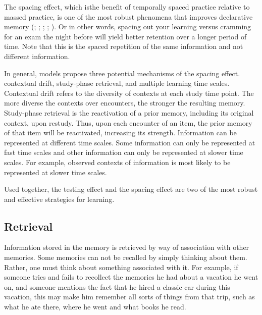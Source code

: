\documentclass[
]{krantz}
\begin{document}
The spacing effect, which isthe benefit of temporally spaced practice relative to massed practice, is one of the most robust phenomena that improves declarative memory (; ; ; ; ). Or in other words, spacing out your learning versus cramming for an exam the night before will yield better retention over a longer period of time. Note that this is the spaced repetition of the same information and not different information.

In general, models propose three potential mechanisms of the spacing effect. contextual drift, study-phase retrieval, and multiple learning time scales. Contextual drift refers to the diversity of contexts at each study time point. The more diverse the contexts over encounters, the stronger the resulting memory. Study-phase retrieval is the reactivation of a prior memory, including its original context, upon restudy. Thus, upon each encounter of an item, the prior memory of that item will be reactivated, increasing its strength. Information can be represented at different time scales. Some information can only be represented at fast time scales and other information can only be represented at slower time scales. For example, observed contexts of information is most likely to be represented at slower time scales.

Used together, the testing effect and the spacing effect are two of the most robust and effective strategies for learning.

\subsection*{Retrieval}\label{retrieval}


Information stored in the memory is retrieved by way of association with other memories. Some memories can not be recalled by simply thinking about them. Rather, one must think about something associated with it. For example, if someone tries and fails to recollect the memories he had about a vacation he went on, and someone mentions the fact that he hired a classic car during this vacation, this may make him remember all sorts of things from that trip, such as what he ate there, where he went and what books he read.
\end{document}

